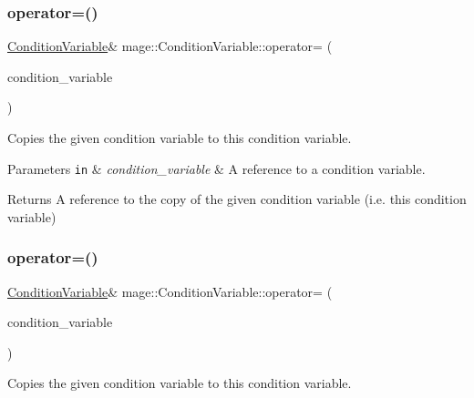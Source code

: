 \subsubsection{\texorpdfstring{operator=()}{operator=()}\hspace{0.1cm}{\footnotesize\ttfamily [1/2]}}
{\footnotesize\ttfamily \hyperlink{classmage_1_1_condition_variable}{Condition\+Variable}\& mage\+::\+Condition\+Variable\+::operator= (\begin{DoxyParamCaption}\item[{const \hyperlink{classmage_1_1_condition_variable}{Condition\+Variable} \&}]{condition\+\_\+variable }\end{DoxyParamCaption})\hspace{0.3cm}{\ttfamily [delete]}}

Copies the given condition variable to this condition variable.


\begin{DoxyParams}[1]{Parameters}
\mbox{\tt in}  & {\em condition\+\_\+variable} & A reference to a condition variable. \\
\hline
\end{DoxyParams}
\begin{DoxyReturn}{Returns}
A reference to the copy of the given condition variable (i.\+e. this condition variable) 
\end{DoxyReturn}
\hypertarget{classmage_1_1_condition_variable_a3f05c5b53b2530e9fdd1bb890aa375c4}{}\label{classmage_1_1_condition_variable_a3f05c5b53b2530e9fdd1bb890aa375c4} 
\subsubsection{\texorpdfstring{operator=()}{operator=()}\hspace{0.1cm}{\footnotesize\ttfamily [2/2]}}
{\footnotesize\ttfamily \hyperlink{classmage_1_1_condition_variable}{Condition\+Variable}\& mage\+::\+Condition\+Variable\+::operator= (\begin{DoxyParamCaption}\item[{\hyperlink{classmage_1_1_condition_variable}{Condition\+Variable} \&\&}]{condition\+\_\+variable }\end{DoxyParamCaption})\hspace{0.3cm}{\ttfamily [delete]}}

Copies the given condition variable to this condition variable.



